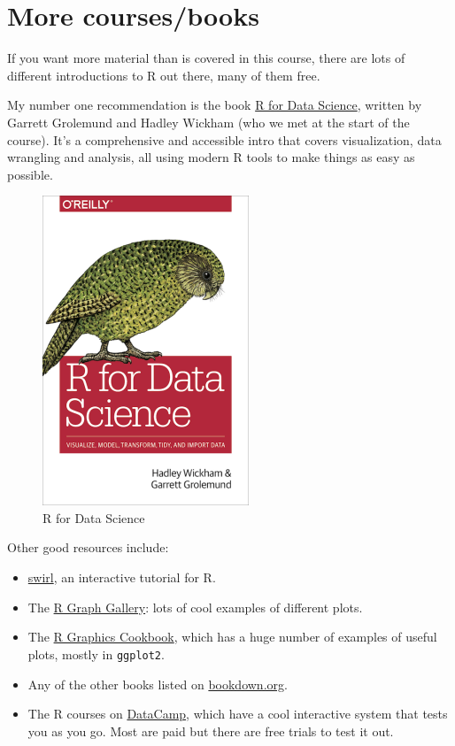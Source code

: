 \documentclass[
]{book}
\providecommand{\tightlist}{%
  \setlength{\itemsep}{0pt}\setlength{\parskip}{0pt}}
\begin{document}
\hypertarget{more-coursesbooks}{%
\section*{More courses/books}\label{more-coursesbooks}}

If you want more material than is covered in this course,
there are lots of different introductions to R out there,
many of them free.

My number one recommendation is the book \href{https://r4ds.had.co.nz/}{R for Data Science},
written by Garrett Grolemund and Hadley Wickham (who we met at the start of
the course). It's a comprehensive and accessible intro that covers visualization,
data wrangling and analysis, all using modern R tools to make things as easy as possible.

\begin{figure}
\centering
\includegraphics{Images/r4ds.png}
\caption{R for Data Science}
\end{figure}

Other good resources include:

\begin{itemize}
\tightlist
\item
  \href{https://swirlstats.com/}{swirl}, an interactive tutorial for R.
\item
  The \href{https://www.r-graph-gallery.com/}{R Graph Gallery}: lots of cool examples of
  different plots.
\item
  The \href{https://r-graphics.org/}{R Graphics Cookbook}, which has a huge number
  of examples of useful plots, mostly in \texttt{ggplot2}.
\item
  Any of the other books listed on \href{https://bookdown.org/}{bookdown.org}.
\item
  The R courses on \href{https://www.datacamp.com/}{DataCamp}, which have a cool
  interactive system that tests you as you go. Most are paid but there are free trials
  to test it out.
\end{itemize}
\end{document}
